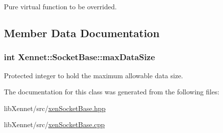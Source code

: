 Pure virtual function to be overrided. 



\subsection{Member Data Documentation}
\hypertarget{classXennet_1_1SocketBase_32530d6e56d4aff4696a76f9588b5f07}{
\subsubsection{\setlength{\rightskip}{0pt plus 5cm}int {\bf Xennet::SocketBase::maxDataSize}}}
\label{classXennet_1_1SocketBase_32530d6e56d4aff4696a76f9588b5f07}


Protected integer to hold the maximum allowable data size. 



The documentation for this class was generated from the following files:\begin{CompactItemize}
\item 
libXennet/src/\hyperlink{xenSocketBase_8hpp}{xenSocketBase.hpp}\item 
libXennet/src/\hyperlink{xenSocketBase_8cpp}{xenSocketBase.cpp}\end{CompactItemize}
